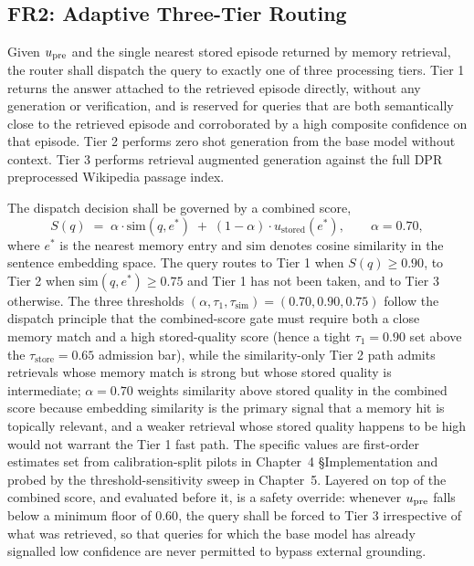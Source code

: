 \subsection{FR2: Adaptive Three-Tier Routing}
\label{sec:fr2}

Given $u_{\text{pre}}$ and the single nearest stored episode returned by memory retrieval, the router shall dispatch the query to exactly one of three processing tiers. Tier 1 returns the answer attached to the retrieved episode directly, without any generation or verification, and is reserved for queries that are both semantically close to the retrieved episode and corroborated by a high composite confidence on that episode. Tier 2 performs zero shot generation from the base model without context. Tier 3 performs retrieval augmented generation against the full DPR preprocessed Wikipedia passage index.

The dispatch decision shall be governed by a combined score,
\begin{equation}
S(q) \;=\; \alpha \cdot \mathrm{sim}(q, e^{\ast}) \;+\; (1 - \alpha) \cdot u_{\text{stored}}(e^{\ast}),
\qquad \alpha = 0.70,
\label{eq:route-score}
\end{equation}
where $e^{\ast}$ is the nearest memory entry and $\mathrm{sim}$ denotes cosine similarity in the sentence embedding space. The query routes to Tier 1 when $S(q) \geq 0.90$, to Tier 2 when $\mathrm{sim}(q, e^{\ast}) \geq 0.75$ and Tier 1 has not been taken, and to Tier 3 otherwise. The three thresholds $(\alpha, \tau_1, \tau_{\text{sim}}) = (0.70, 0.90, 0.75)$ follow the dispatch principle that the combined-score gate must require both a close memory match and a high stored-quality score (hence a tight $\tau_1 = 0.90$ set above the $\tau_{\text{store}} = 0.65$ admission bar), while the similarity-only Tier 2 path admits retrievals whose memory match is strong but whose stored quality is intermediate; $\alpha = 0.70$ weights similarity above stored quality in the combined score because embedding similarity is the primary signal that a memory hit is topically relevant, and a weaker retrieval whose stored quality happens to be high would not warrant the Tier 1 fast path. The specific values are first-order estimates set from calibration-split pilots in Chapter~4 §Implementation and probed by the threshold-sensitivity sweep in Chapter~5. Layered on top of the combined score, and evaluated before it, is a safety override: whenever $u_{\text{pre}}$ falls below a minimum floor of $0.60$, the query shall be forced to Tier 3 irrespective of what was retrieved, so that queries for which the base model has already signalled low confidence are never permitted to bypass external grounding.


